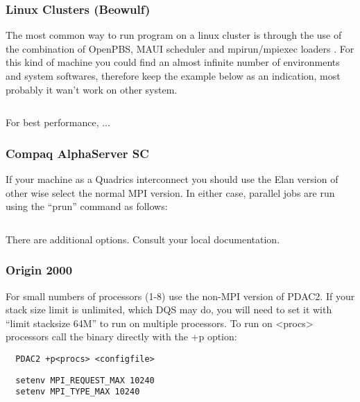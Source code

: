 \begin{verbatim}
\end{verbatim}


\subsubsection{Linux Clusters (Beowulf)}

The most common way to run program on a linux cluster 
is through the use of the combination of OpenPBS, MAUI scheduler
and mpirun/mpiexec loaders .
For this kind of machine you could find an almost infinite number
of environments and system softwares, therefore keep the example below
as an indication, most probably it wan't work on other system. 

\begin{verbatim}
\end{verbatim}

For best performance, ...

\subsubsection{Compaq AlphaServer SC}

If your machine as a Quadrics interconnect you should use the Elan
version of \PDAC\, other wise select the normal MPI version.  In either
case, parallel jobs are run using the ``prun'' command as follows:

\begin{verbatim}
\end{verbatim}

There are additional options.  Consult your local documentation.

\subsubsection{Origin 2000}

For small numbers of processors (1-8) use the non-MPI version of PDAC2.
If your stack size limit is unlimited, which DQS may do, you will need
to set it with ``limit stacksize 64M'' to run on multiple processors.
To run on <procs> processors call the binary directly with the +p option:

\begin{verbatim}
  PDAC2 +p<procs> <configfile>
\end{verbatim}

\begin{verbatim}
  setenv MPI_REQUEST_MAX 10240
  setenv MPI_TYPE_MAX 10240
\end{verbatim}

